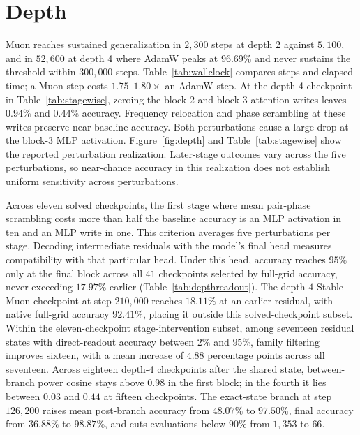 \section{Depth}
\label{app:depth}






Muon reaches sustained generalization in $2{,}300$ steps at depth 2 against $5{,}100$, and in $52{,}600$ at depth 4 where AdamW peaks at $96.69\%$ and never sustains the threshold within $300{,}000$ steps. Table~\ref{tab:wallclock} compares steps and elapsed time; a Muon step costs $1.75$--$1.80\times$ an AdamW step. At the depth-4 checkpoint in Table~\ref{tab:stagewise}, zeroing the block-2 and block-3 attention writes leaves $0.94\%$ and $0.44\%$ accuracy. Frequency relocation and phase scrambling at these writes preserve near-baseline accuracy. Both perturbations cause a large drop at the block-3 MLP activation. Figure~\ref{fig:depth} and Table~\ref{tab:stagewise} show the reported perturbation realization. Later-stage outcomes vary across the five perturbations, so near-chance accuracy in this realization does not establish uniform sensitivity across perturbations.

Across eleven solved checkpoints, the first stage where mean pair-phase scrambling costs more than half the baseline accuracy is an MLP activation in ten and an MLP write in one. This criterion averages five perturbations per stage. Decoding intermediate residuals with the model's final head measures compatibility with that particular head. Under this head, accuracy reaches $95\%$ only at the final block across all $41$ checkpoints selected by full-grid accuracy, never exceeding $17.97\%$ earlier (Table~\ref{tab:depthreadout}). The depth-$4$ Stable Muon checkpoint at step $210{,}000$ reaches $18.11\%$ at an earlier residual, with native full-grid accuracy $92.41\%$, placing it outside this solved-checkpoint subset. Within the eleven-checkpoint stage-intervention subset, among seventeen residual states with direct-readout accuracy between $2\%$ and $95\%$, family filtering improves sixteen, with a mean increase of $4.88$ percentage points across all seventeen. Across eighteen depth-4 checkpoints after the shared state, between-branch power cosine stays above $0.98$ in the first block; in the fourth it lies between $0.03$ and $0.44$ at fifteen checkpoints. The exact-state branch at step $126{,}200$ raises mean post-branch accuracy from $48.07\%$ to $97.50\%$, final accuracy from $36.88\%$ to $98.87\%$, and cuts evaluations below $90\%$ from $1{,}353$ to $66$.
